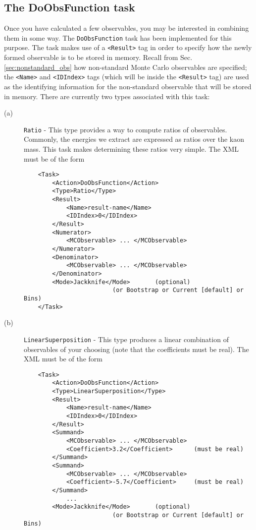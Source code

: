 \documentclass[12pt,notitlepage,letterpaper]{article}
\newcommand{\vb}{\texttt}
\begin{document}
\subsection{The DoObsFunction task}

Once you have calculated a few observables, you may be interested in combining them in some way.
The \vb{DoObsFunction} task has been implemented for this purpose.
The task makes use of a \vb{<Result>} tag in order to specify how
the newly formed observable is to be stored in memory.
Recall from Sec. \ref{sec:nonstandard_obs}
how non-standard Monte Carlo observables are specified; the \vb{<Name>}
and \vb{<IDIndex>} tags (which will be inside the \vb{<Result>} tag)
are used as the identifying information
for the non-standard observable that will be stored in memory.
There are currently two types
associated with this task:
\begin{description}
\item[(a)] \vb{Ratio} - This type provides a way to compute ratios of observables. Commonly,
the energies we extract are expressed as ratios over the kaon mass. This task makes
determining these ratios very simple. The XML must be of the form
\begin{verbatim}
    <Task>
        <Action>DoObsFunction</Action>
        <Type>Ratio</Type>
        <Result>
            <Name>result-name</Name>
            <IDIndex>0</IDIndex>
        </Result>
        <Numerator>
            <MCObservable> ... </MCObservable>
        </Numerator>
        <Denominator>
            <MCObservable> ... </MCObservable>
        </Denominator>
        <Mode>Jackknife</Mode>       (optional)
                         (or Bootstrap or Current [default] or Bins)
    </Task>
\end{verbatim}
\item[(b)] \vb{LinearSuperposition} - This type produces a linear combination
of observables of your choosing (note that the coefficients must be real).
The XML must be of the form
\begin{verbatim}
    <Task>
        <Action>DoObsFunction</Action>
        <Type>LinearSuperposition</Type>
        <Result>
            <Name>result-name</Name>
            <IDIndex>0</IDIndex>
        </Result>
        <Summand>
            <MCObservable> ... </MCObservable>
            <Coefficient>3.2</Coefficient>      (must be real)
        </Summand>
        <Summand>
            <MCObservable> ... </MCObservable>
            <Coefficient>-5.7</Coefficient>     (must be real)
        </Summand>
            ...
        <Mode>Jackknife</Mode>       (optional)
                         (or Bootstrap or Current [default] or Bins)
\end{verbatim}
\end{description}
\end{document}
